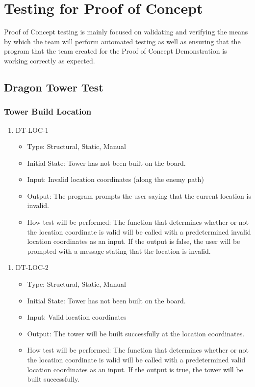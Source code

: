 \documentclass[12,english]{article}
\begin{document}
\section{Testing for Proof of Concept}
Proof of Concept testing is mainly focused on validating and verifying the means by which the team will perform automated testing as well as ensuring that the program that the team created for the Proof of Concept Demonstration is working correctly as expected. 

\subsection{Dragon Tower Test}
\subsubsection{Tower Build Location}

\begin{enumerate}
    \item DT-LOC-1
    \begin{itemize}
        \item Type: Structural, Static, Manual
        \item Initial State: Tower has not been built on the board.
        \item Input: Invalid location coordinates (along the enemy path)
        \item Output: The program prompts the user saying that the current location is invalid.
        \item How test will be performed: The function that determines whether or not the location coordinate is valid will be called with a predetermined invalid location coordinates as an input. If the output is false, the user will be prompted with a message stating that the location is invalid.
    \end{itemize}
\end{enumerate}

\begin{enumerate}
    \item DT-LOC-2
    \begin{itemize}
        \item Type: Structural, Static, Manual
        \item Initial State: Tower has not been built on the board.
        \item Input: Valid location coordinates
        \item Output: The tower will be built successfully at the location coordinates.
        \item How test will be performed: The function that determines whether or not the location coordinate is valid will be called with a predetermined valid location coordinates as an input. If the output is true, the tower will be built successfully.
    \end{itemize}
\end{enumerate}
\end{document}
